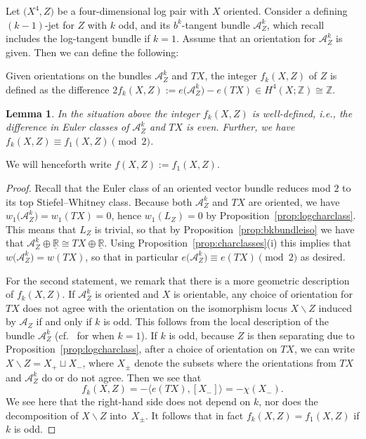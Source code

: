 \documentclass[10pt,a4paper]{amsart}
\numberwithin{equation}{section}
\newtheorem{Lemma}[Theorem]{Lemma}
\begin{document}
Let $\big(X^4,Z\big)$ be a four-dimensional log pair with $X$ oriented. Consider a defining $(k-1)$-jet for $Z$ with $k$ odd, and its $b^k$-tangent bundle $\mathcal{A}_Z^k$, which recall includes the log-tangent bundle if $k = 1$. Assume that an orientation for $\mathcal{A}_Z^k$ is given. Then we can define the following:

\begin{Definition}\label{defn:discrepancy} Given orientations on the bundles $\mathcal{A}_Z^k$ and $TX$, the integer $f_k(X,Z)$ of $Z$ is defined as the difference $2 f_k(X,Z) := e\big(\mathcal{A}_Z^k\big) - e(TX) \in H^4(X;\mathbb{Z}) \cong \mathbb{Z}$.
\end{Definition}

\begin{Lemma}\label{lem:kdiscrepancy} In the situation above the integer $f_k(X,Z)$ is well-defined, i.e., the difference in Euler classes of $\mathcal{A}_Z^k$ and $TX$ is even. Further, we have $f_k(X,Z) \equiv f_1(X,Z) \pmod{2}$.
\end{Lemma}

We will henceforth write $f(X,Z) := f_1(X,Z)$.

\begin{proof} Recall that the Euler class of an oriented vector bundle reduces mod $2$ to its top Stiefel--Whitney class. Because both $\mathcal{A}_Z^k$ and $TX$ are oriented, we have $w_1\big(\mathcal{A}_Z^k\big) = w_1(TX) = 0$, hence $w_1(L_Z) = 0$ by Proposition~\ref{prop:logcharclass}. This means that $L_Z$ is trivial, so that by Proposition~\ref{prop:bkbundleiso} we have that $\mathcal{A}_Z^k \oplus \underline{\mathbb{R}} \cong TX \oplus \underline{\mathbb{R}}$. Using Proposition~\ref{prop:charclasses}(i) this implies that $w\big(\mathcal{A}_Z^k\big) = w(TX)$, so that in particular $e\big(\mathcal{A}_Z^k\big) \equiv e(TX) \pmod{2}$ as desired.

For the second statement, we remark that there is a more geometric description of $f_k(X,Z)$. If $\mathcal{A}^k_Z$ is oriented and $X$ is orientable, any choice of orientation for $TX$ does not agree with the orientation on the isomorphism locus $X \backslash Z$ induced by $\mathcal{A}_Z$ if and only if $k$ is odd. This follows from the local description of the bundle $\mathcal{A}_Z^k$ (cf.\ \cite{CavalcantiKlaasse19} for when $k = 1$). If $k$ is odd, because $Z$ is then separating due to Proposition~\ref{prop:logcharclass}, after a choice of orientation on $TX$, we can write $X \backslash Z = X_+ \sqcup X_-$, where $X_\pm$ denote the subsets where the orientations from $TX$ and $\mathcal{A}_Z^k$ do or do not agree. Then we see that
\begin{displaymath}
	f_k(X,Z) = - \langle e(TX), [X_-] \rangle = - \chi(X_-).
\end{displaymath}
We see here that the right-hand side does not depend on $k$, nor does the decomposition of $X\backslash Z$ into~$X_\pm$. It follows that in fact $f_k(X,Z) = f_1(X,Z)$ if $k$ is odd.
\end{proof}
\end{document}
